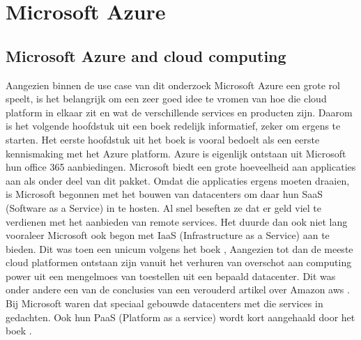 \section{Microsoft Azure}
\subsection{Microsoft Azure and cloud computing}
Aangezien binnen de use case van dit onderzoek Microsoft Azure een grote rol speelt, is het belangrijk om een zeer goed idee te vromen van hoe die cloud platform in elkaar zit en wat de verschillende services en producten zijn. Daarom is het volgende hoofdstuk uit een boek \autocite{Copeland2015} redelijk informatief, zeker om ergens te starten.
\newline
\newline
Het eerste hoofdstuk uit het boek \autocite{Copeland2015} is vooral bedoelt als een eerste kennismaking met het Azure platform. Azure is eigenlijk ontstaan uit Microsoft hun office 365 aanbiedingen. Microsoft biedt een grote hoeveelheid aan applicaties aan als onder deel van dit pakket. Omdat die applicaties ergens moeten draaien, is Microsoft begonnen met het bouwen van datacenters om daar hun SaaS (Software as a Service) in te hosten. Al snel beseften ze dat er geld viel te verdienen met het aanbieden van remote services. Het duurde dan ook niet lang vooraleer Microsoft ook begon met IaaS (Infrastructure as a Service) aan te bieden. Dit was toen een unicum volgens het boek \autocite{Copeland2015}, Aangezien tot dan de meeste cloud platformen ontstaan zijn vanuit het verhuren van overschot aan computing power uit een mengelmoes van toestellen uit een bepaald datacenter. Dit was onder andere een van de conclusies van een verouderd artikel over Amazon aws \autocite{Jackson2010}. Bij Microsoft waren dat speciaal gebouwde datacenters met die services in gedachten. Ook hun PaaS (Platform as a service) wordt kort aangehaald door het boek \autocite{Copeland2015}.

